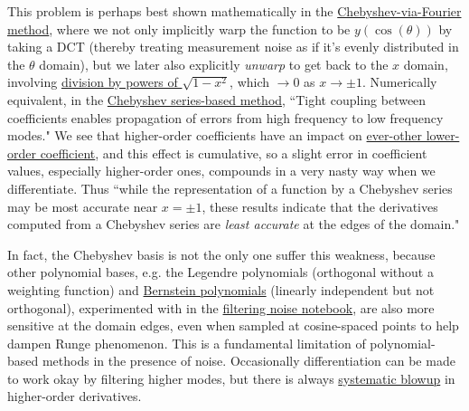 \documentclass[10pt]{article}
\begin{document}
This problem is perhaps best shown mathematically in the \hyperref[algo]{Chebyshev-via-Fourier method}, where we not only implicitly warp the function to be $y(\cos(\theta))$ by taking a DCT (thereby treating measurement noise as if it's evenly distributed in the $\theta$ domain), but we later also explicitly \textit{unwarp} to get back to the $x$ domain, involving \hyperref[pyramid]{division by powers of $\sqrt{1-x^2}$}\cite{brown}\cite{trefethen8}, which $ \rightarrow 0$ as $x \rightarrow \pm 1$. Numerically equivalent, in the \hyperref[seriesrule]{Chebyshev series-based method}, ``Tight coupling between coefficients enables propagation of errors from high frequency to low frequency modes."\cite{brown} We see that higher-order coefficients have an impact on \href{https://scicomp.stackexchange.com/q/44939/48402}{ever-other lower-order coefficient}\cite{dcoefs}, and this effect is cumulative, so a slight error in coefficient values, especially higher-order ones, compounds in a very nasty way when we differentiate. Thus ``while the representation of a function by a Chebyshev series may be most accurate near $x = \pm 1$, these results indicate that the derivatives computed from a Chebyshev series are \textit{least accurate} at the edges of the domain."\cite{brown}

In fact, the Chebyshev basis is not the only one suffer this weakness, because other polynomial bases, e.g. the Legendre polynomials (orthogonal without a weighting function) and \href{https://en.wikipedia.org/wiki/Bernstein_polynomial}{Bernstein polynomials} (linearly independent but not orthogonal), experimented with in the \href{https://github.com/pavelkomarov/spectral-derivatives/blob/main/notebooks/filtering_noise.ipynb}{filtering noise notebook}, are also more sensitive at the domain edges, even when sampled at cosine-spaced points to help dampen Runge phenomenon. This is a fundamental limitation of polynomial-based methods in the presence of noise. Occasionally differentiation can be made to work okay by filtering higher modes, but there is always \href{https://github.com/pavelkomarov/spectral-derivatives/blob/main/notebooks/filtering_noise.ipynb}{systematic blowup} in higher-order derivatives.

\printendnotes
\end{document}
